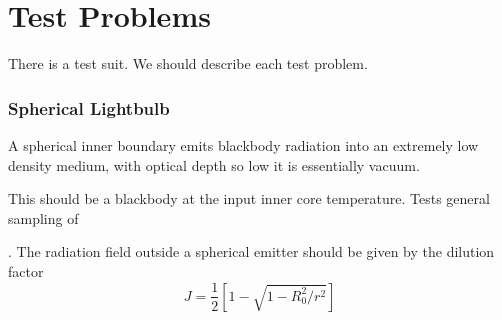 
\chapter{Test Problems}

There is a test suit. We should describe each test problem.

\subsection{Spherical Lightbulb}

 A spherical inner boundary emits blackbody radiation into an extremely low density
medium, with optical depth so low it is essentially vacuum.

\setcounter{tc}{1}
 This should be a blackbody at the input inner core temperature. Tests general sampling of 

. The radiation field outside a spherical emitter should be given by the dilution factor
\begin{equation}
J = \frac{1}{2} \left[ 1 - \sqrt{ 1 - R_0^2/r^2} \right]
\end{equation}






